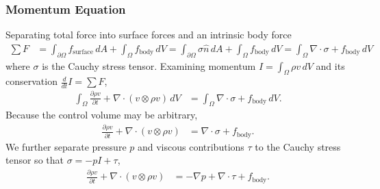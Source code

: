 \documentclass[letterpaper,11pt,nointlimits]{amsart}
\begin{document}
\subsubsection{Momentum Equation} 
Separating total force into surface forces and an intrinsic body force
\begin{align}
  \sum{}F
  &= 
     \int_{\partial\Omega} f_\text{surface} \, dA 
   + \int_{\Omega} f_\text{body} \, dV 
  = 
     \int_{\partial\Omega} \sigma \hat{n} \, dA 
  +  \int_{\Omega} f_\text{body} \, dV 
  =  \int_{\Omega} \nabla\cdot\sigma + f_\text{body} \, dV 
\end{align}
where $\sigma$ is the Cauchy stress tensor.  Examining
momentum $I=\int_{\Omega} \rho{}v\,dV$ and its conservation
$\frac{d}{dt}I=\sum{}F$,
\begin{align}
  \int_{\Omega}\frac{\partial{}\rho{}v}{\partial{}t}+\nabla\cdot(v\otimes{}\rho{}v)\,dV
&= \int_{\Omega} \nabla\cdot\sigma + f_\text{body} \, dV 
.
\end{align}
Because the control volume may be arbitrary, 
\begin{align}
\frac{\partial\rho{}v}{\partial{}t} + \nabla\cdot(v\otimes{}\rho{}v) 
&= \nabla\cdot\sigma + f_\text{body}
.
\end{align}
We further separate pressure $p$ and viscous contributions $\tau$ to
the Cauchy stress tensor so that $\sigma = -p I + \tau$,
\begin{align}
\label{eq:cons_momentum}
\frac{\partial\rho{}v}{\partial{}t} + \nabla\cdot(v\otimes{}\rho{}v) 
&= -\nabla{}p + \nabla\cdot{}\tau + f_\text{body}
.
\end{align}
\end{document}
